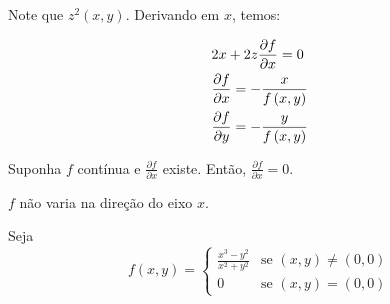 \documentclass[11pt, oneside, a4paper]{gsm-l}
\begin{document}
\begin{sol}
Note que $z^2 \left( {x,y} \right)$. Derivando em $x$, temos:

\[
\begin{gathered}
2x + 2z\frac{{\partial f}}{{\partial x}} = 0 \hfill \\
      \frac{{\partial f}}{{\partial x}} =  - \frac{x}{{f\left( {x,y} \right)}} \hfill \\
\frac{{\partial f}}{{\partial y}} =  - \frac{y}
{{f\left( {x,y} \right)}} \hfill \\
\end{gathered}
\]

\end{sol}

\begin{exem}
    Suponha $f$ contínua e $\frac{{\partial f}}{{\partial x}}$ existe. Então, $\frac{{\partial f}}{{\partial x}} = 0$.
\end{exem}

\begin{sol}
$f$ não varia na direção do eixo $x$.
\end{sol}

\begin{exem}
Seja
\begin{equation*}
f(x,y)=\left\{ \begin{array}{cl}\displaystyle
        \frac{{x^3  - y^2 }}{{x^2  + y^2 }} & \textrm{se }\left( {x,y} \right) \ne \left( {0,0} \right)\\
        0 & \textrm{se }\left( {x,y} \right) = \left( {0,0} \right)\end{array}\right.
\end{equation*}
\end{exem}
\end{document}
